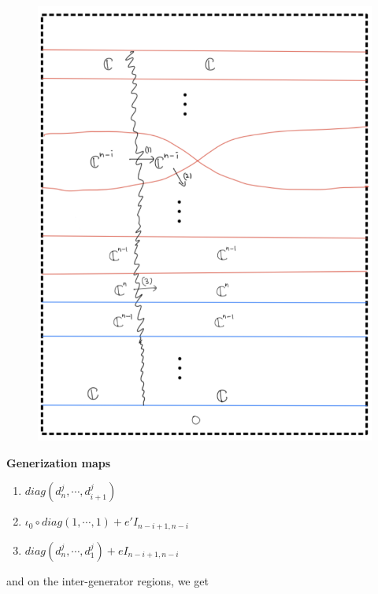 \begin{enumerate}[label = (Step \arabic*)]
\begin{figure}[H]
    \includegraphics[scale = 0.95]{diagrams/cobord_full/5.png}
    \caption{}
    \label{fig:your-label}
\end{figure}
\textbf{Generization maps}
\begin{enumerate}
\item $diag(d^j_n,\cdots, d^j_{i+1})$
\item $\iota_0 \circ diag(1,\cdots, 1) + e'I_{n-i+1,n-i}$
\item $diag(d^j_n,\cdots, d^j_{1})+ eI_{n-i+1,n-i}$
\end{enumerate}
and on the inter-generator regions, we get
\begin{figure}[H]
    \centering

\end{figure}
\end{enumerate}
